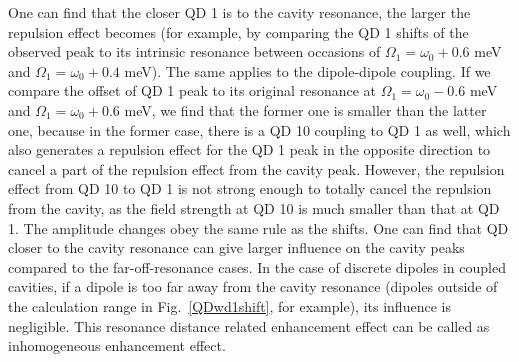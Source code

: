 One can find that the closer QD 1 is to the cavity resonance, the larger the repulsion effect becomes (for example, by comparing the QD 1 shifts of the observed peak to its intrinsic resonance between occasions of $\Omega_1=\omega_0+0.6$ meV and $\Omega_1=\omega_0+0.4$ meV). The same applies to the dipole-dipole coupling. If we compare the offset of QD 1 peak to its original resonance at $\Omega_1=\omega_0-0.6$ meV and $\Omega_1=\omega_0+0.6$ meV, we find that the former one is smaller than the latter one, because in the former case, there is a QD 10 coupling to QD 1 as well, which also generates a repulsion effect for the QD 1 peak in the opposite direction to cancel a part of the repulsion effect from the cavity peak. However, the repulsion effect from QD 10 to QD 1 is not strong enough to totally cancel the repulsion from the cavity, as the field strength at QD 10 is much smaller than that at QD 1. The amplitude changes obey the same rule as the shifts. One can find that QD closer to the cavity resonance can give larger influence on the cavity peaks compared to the far-off-resonance cases. In the case of discrete dipoles in coupled cavities, if a dipole is too far away from the cavity resonance (dipoles outside of the calculation range in Fig.~\ref{QDwd1shift}, for example), its influence is negligible. This resonance distance related enhancement effect can be called as inhomogeneous enhancement effect.



